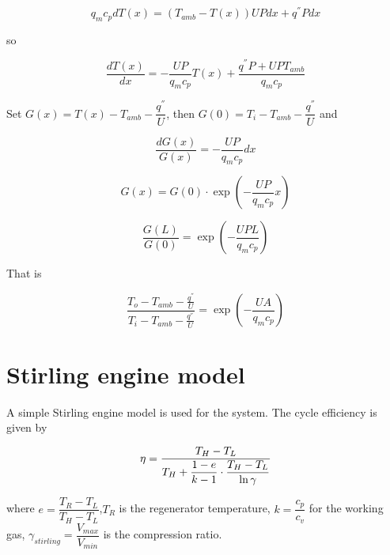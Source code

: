 \documentclass{article}
\begin{document}
\begin{equation*}
	q_{m}c_{p}dT(x)=(T_{amb}-T(x))UPdx+q^{''}Pdx
\end{equation*}

so

\begin{equation*}
	\frac{dT(x)}{dx}=-\frac{UP}{q_{m}c_{p}}T(x)+\frac{q^{''}P+UPT_{amb}}{q_{m}c_{p}}
\end{equation*}

Set $G(x)=T(x)-T_{amb}-\dfrac{q^{''}}{U}$, then $G(0)=T_{i}-T_{amb}-\dfrac{q^{''}}{U}$ and

\begin{equation*}
	\dfrac{dG(x)}{G(x)}=-\dfrac{UP}{q_{m}c_{p}}dx
\end{equation*}

\begin{equation*}
	G(x)=G(0)\cdot\exp(-\dfrac{UP}{q_{m}c_{p}}x)
\end{equation*}

\begin{equation*}
	\dfrac{G(L)}{G(0)}=\exp(-\dfrac{UPL}{q_{m}c_{p}})
\end{equation*}

That is

\begin{equation*}
	\frac{T_{o}-T_{amb}-\frac{q^{''}}{U}}{T_{i}-T_{amb}-\frac{q^{''}}{U}}=\exp(-\frac{UA}{q_{m}c_{p}})
\end{equation*}
\clearpage{}

\section{\noindent \label{sec:Stirling-engine-model}Stirling engine model}

A simple Stirling engine model is used for the system. The cycle efficiency is given by \cite{Stine1985}

\begin{equation}
	\eta=\frac{T_{H}-T_{L}}{T_{H}+\text{\ensuremath{\dfrac{1-e}{k-1}}}\cdot\dfrac{T_{H}-T_{L}}{\ln\gamma}}\label{eq:eta_stirling}
\end{equation}


where $e=\dfrac{T_{R}-T_{L}}{T_{H}-T_{L}}$,$T_{R}$ is the\emph{ }regenerator temperature, $k=\dfrac{c_{p}}{c_{v}}$ for the working gas, $\gamma_{stirling}=\dfrac{V_{max}}{V_{min}}$ is the compression ratio.
\end{document}
